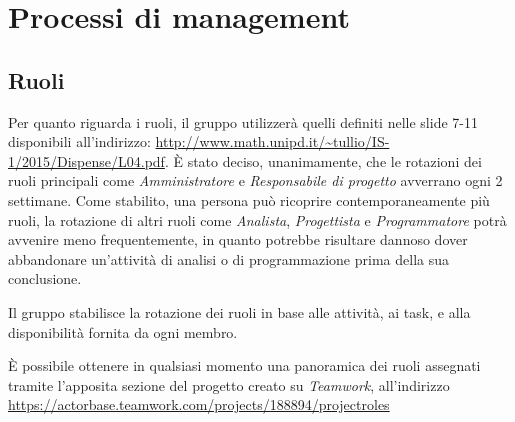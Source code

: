\documentclass[a4paper]{report}
\begin{document}
	\section{Processi di management}
	\subsection{Ruoli}
	Per quanto riguarda i ruoli, il gruppo utilizzerà quelli definiti nelle slide 7-11 disponibili all'indirizzo: 
	\url{http://www.math.unipd.it/~tullio/IS-1/2015/Dispense/L04.pdf}. È stato deciso, unanimamente, che le rotazioni dei ruoli principali
	come \emph{Amministratore} e \emph{Responsabile di progetto} avverrano ogni 2 settimane. Come stabilito, una persona può ricoprire
	contemporaneamente più ruoli, la rotazione di altri ruoli come \emph{Analista}, \emph{Progettista} e \emph{Programmatore} potrà avvenire 
	meno frequentemente, in quanto potrebbe risultare dannoso dover abbandonare un'attività di analisi o di programmazione prima della sua 
	conclusione. 
	
	Il gruppo stabilisce la rotazione dei ruoli in base alle attività, ai task, e alla disponibilità fornita da ogni membro.
	
	È possibile ottenere in qualsiasi momento una panoramica dei ruoli assegnati tramite l'apposita sezione del 
	progetto creato su \emph{Teamwork}, all'indirizzo\\ \url{https://actorbase.teamwork.com/projects/188894/projectroles} 
\end{document}
